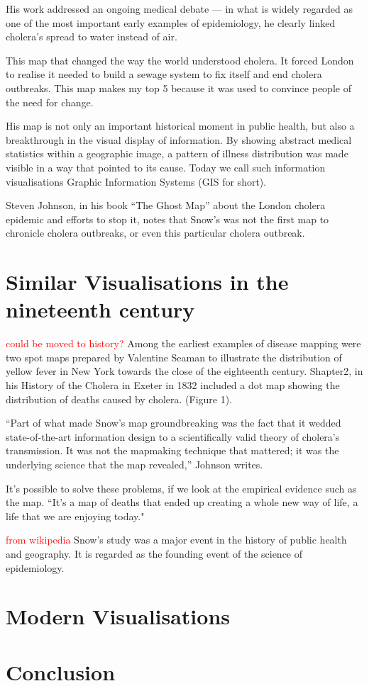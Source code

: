 \documentclass[12pt]{article}
\newcommand\todo[1]{\textcolor{red}{#1}}
\begin{document}
His work addressed an ongoing medical debate — in what is widely regarded as one of the most important early examples of epidemiology, he clearly linked cholera’s spread to water instead of air. \cite{blog}

This map that changed the way the world understood cholera. It forced London to realise it needed to build a sewage system to fix itself and end cholera outbreaks. This map makes my top 5 because it was used to convince people of the need for change. \cite{top5}

His map is not only an important historical moment in public health, but also a breakthrough in the visual display of information. By showing abstract medical statistics within a geographic image, a pattern of illness distribution was made visible in a way that pointed to its cause. Today we call such information visualisations Graphic Information Systems (GIS for short). \cite{test}

Steven Johnson, in his book “The Ghost Map” about the London cholera epidemic and efforts to stop it, notes that Snow’s was not the first map to chronicle cholera outbreaks, or even this particular cholera outbreak. \cite{history}

\section{Similar Visualisations in the nineteenth century}
\todo{could be moved to history?}
Among the earliest examples of disease mapping were
two spot maps prepared by Valentine Seaman to illustrate
the distribution of yellow fever in New York
towards the close of the eighteenth century. Shapter2, in
his History of the Cholera in Exeter in 1832 included a dot
map showing the distribution of deaths caused by
cholera. (Figure 1). \cite{howe1970some}

“Part of what made Snow’s map groundbreaking was the fact that it wedded state-of-the-art information design to a scientifically valid theory of cholera’s transmission. It was not the mapmaking technique that mattered; it was the underlying science that the map revealed,” Johnson writes. \cite{history}

It's possible to solve these problems, if we look at the empirical evidence such as the map. ``It's a  map of deaths that ended up creating a whole new way of life, a life that we are enjoying today." \cite{tedtalk}

\todo{from wikipedia}
Snow's study was a major event in the history of public health and geography. It is regarded as the founding event of the science of epidemiology.


\section{Modern Visualisations}

\section{Conclusion}


% 
% 




\end{document}
